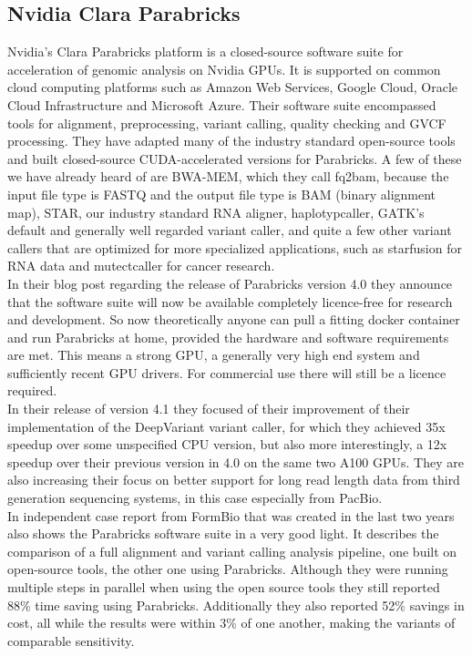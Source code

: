 \documentclass[conference]{IEEEtran}
\begin{document}
\subsection{Nvidia Clara Parabricks}
Nvidia's Clara Parabricks platform is a closed-source software suite for acceleration of genomic analysis on Nvidia GPUs. It is supported on common cloud computing platforms such as Amazon Web Services, Google Cloud, Oracle Cloud Infrastructure and Microsoft Azure. Their software suite encompassed tools for alignment, preprocessing, variant calling, quality checking and GVCF processing. They have adapted many of the industry standard open-source tools and built closed-source CUDA-accelerated versions for Parabricks. A few of these we have already heard of are BWA-MEM, which they call fq2bam, because the input file type is FASTQ and the output file type is BAM (binary alignment map), STAR, our industry standard RNA aligner, haplotypcaller, GATK's default and generally well regarded variant caller, and quite a few other variant callers that are optimized for more specialized applications, such as starfusion for RNA data and mutectcaller for cancer research.\\
In their blog post regarding the release of Parabricks version 4.0 they announce that the software suite will now be available completely licence-free for research and development. So now theoretically anyone can pull a fitting docker container and run Parabricks at home, provided the hardware and software requirements are met. This means a strong GPU, a generally very high end system and sufficiently recent GPU drivers. For commercial use there will still be a licence required\cite{says_democratizing_2022}. \\
In their release of version 4.1 they focused of their improvement of their implementation of the DeepVariant variant caller, for which they achieved 35x speedup over some unspecified CPU version, but also more interestingly, a 12x speedup over their previous version in 4.0 on the same two A100 GPUs. They are also increasing their focus on better support for long read length data from third generation sequencing systems, in this case especially from PacBio\cite{noauthor_long-read_2023}.\\
In independent case report from FormBio that was created in the last two years also shows the Parabricks software suite in a very good light. It describes the comparison of a full alignment and variant calling analysis pipeline, one built on open-source tools, the other one using Parabricks. Although they were running multiple steps in parallel when using the open source tools they still reported 88\% time saving using Parabricks. Additionally they also reported 52\% savings in cost, all while the results were within 3\% of one another, making the variants of comparable sensitivity\cite{cantarel_comparing_nodate}. 
\end{document}
